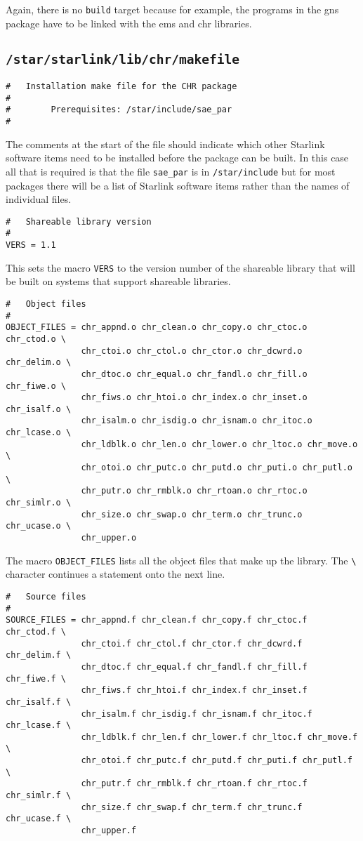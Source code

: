 Again, there is no {\tt build} target because for example, the programs in
the gns package have to be linked with the ems and chr libraries.
\subsection{\tt /star/starlink/lib/chr/makefile}
\begin{verbatim}
#   Installation make file for the CHR package
#
#        Prerequisites: /star/include/sae_par
#
\end{verbatim}
The comments at the start of the file
should indicate which other Starlink software items need to be installed before
the package can be built. In this case all that is required is that the file
{\tt sae\_par} is in {\tt /star/include} but for most packages there will be a
list of Starlink software items rather than the names of individual files.
\begin{verbatim}
#   Shareable library version
#
VERS = 1.1
\end{verbatim}
This sets the macro {\tt VERS} to the version number of the shareable
library that will be built on systems that support shareable libraries.
\begin{verbatim}
#   Object files
#
OBJECT_FILES = chr_appnd.o chr_clean.o chr_copy.o chr_ctoc.o chr_ctod.o \
               chr_ctoi.o chr_ctol.o chr_ctor.o chr_dcwrd.o chr_delim.o \
               chr_dtoc.o chr_equal.o chr_fandl.o chr_fill.o chr_fiwe.o \
               chr_fiws.o chr_htoi.o chr_index.o chr_inset.o chr_isalf.o \
               chr_isalm.o chr_isdig.o chr_isnam.o chr_itoc.o chr_lcase.o \
               chr_ldblk.o chr_len.o chr_lower.o chr_ltoc.o chr_move.o \
               chr_otoi.o chr_putc.o chr_putd.o chr_puti.o chr_putl.o \
               chr_putr.o chr_rmblk.o chr_rtoan.o chr_rtoc.o chr_simlr.o \
               chr_size.o chr_swap.o chr_term.o chr_trunc.o chr_ucase.o \
               chr_upper.o
\end{verbatim}
The macro {\tt OBJECT\_FILES} lists all the object files that make up the
library. The \verb+\+ character continues a statement onto the next line.
\begin{verbatim}
#   Source files
#
SOURCE_FILES = chr_appnd.f chr_clean.f chr_copy.f chr_ctoc.f chr_ctod.f \
               chr_ctoi.f chr_ctol.f chr_ctor.f chr_dcwrd.f chr_delim.f \
               chr_dtoc.f chr_equal.f chr_fandl.f chr_fill.f chr_fiwe.f \
               chr_fiws.f chr_htoi.f chr_index.f chr_inset.f chr_isalf.f \
               chr_isalm.f chr_isdig.f chr_isnam.f chr_itoc.f chr_lcase.f \
               chr_ldblk.f chr_len.f chr_lower.f chr_ltoc.f chr_move.f \
               chr_otoi.f chr_putc.f chr_putd.f chr_puti.f chr_putl.f \
               chr_putr.f chr_rmblk.f chr_rtoan.f chr_rtoc.f chr_simlr.f \
               chr_size.f chr_swap.f chr_term.f chr_trunc.f chr_ucase.f \
               chr_upper.f
\end{verbatim}
